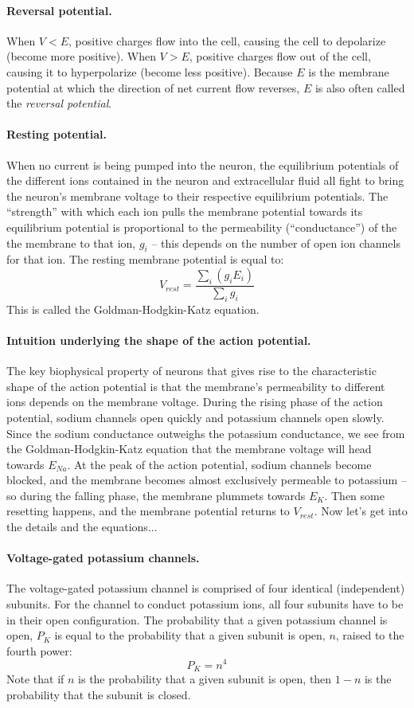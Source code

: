 \documentclass[11pt]{article}
\begin{document}
\paragraph{Reversal potential.}  When $V < E$, positive charges flow into the cell, causing the cell to depolarize (become more positive).  When $V > E$, positive charges flow out of the cell, causing it to hyperpolarize (become less positive).  Because $E$ is the membrane potential at which the direction of net current flow reverses, $E$ is also often called the \textit{reversal potential}.

\paragraph{Resting potential.}  When no current is being pumped into the neuron, the equilibrium potentials of the different ions contained in the neuron and extracellular fluid all fight to bring the neuron's membrane voltage to their respective equilibrium potentials.  The ``strength'' with which each ion pulls the membrane potential towards its equilibrium potential is proportional to the permeability (``conductance'') of the the membrane to that ion, $g_i$ -- this depends on the number of open ion channels for that ion.  The resting membrane potential is equal to:
\[
V_{rest} = \frac{\sum_i (g_iE_i)}{\sum_i g_i}
\]
This is called the Goldman-Hodgkin-Katz equation.

\paragraph{Intuition underlying the shape of the action potential.}  The key biophysical property of neurons that gives rise to the characteristic shape of the action potential is that the membrane's permeability to different ions depends on the membrane voltage.  During the rising phase of the action potential, sodium channels open quickly and potassium channels open slowly.  Since the sodium conductance outweighs the potassium conductance, we see from the Goldman-Hodgkin-Katz equation that the membrane voltage will head towards $E_{Na}$.  At the peak of the action potential, sodium channels become blocked, and the membrane becomes almost exclusively permeable to potassium -- so during the falling phase, the membrane plummets towards $E_K$.  Then some resetting happens, and the membrane potential returns to $V_{rest}$.  Now let's get into the details and the equations...

\paragraph{Voltage-gated potassium channels.}  The voltage-gated potassium channel is comprised of four identical (independent) subunits.  For the channel to conduct potassium ions, all four subunits have to be in their open configuration.  The probability that a given potassium channel is open, $P_K$ is equal to the probability that a given subunit is open, $n$, raised to the fourth power:
\[
P_K = n^4
\]
Note that if $n$ is the probability that a given subunit is open, then $1-n$ is the probability that the subunit is closed.  
\end{document}
